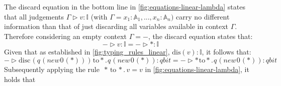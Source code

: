 The discard equation in  the bottom line  in \autoref{fig:equations-linear-lambda} states that all judgements $\Gamma \triangleright v : \mathbb{I}$ (with $\Gamma = x_{1} : \mathbb{A}_1, . . . , x_{n} : \mathbb{A}_n)$ carry no different information than that of just discarding all variables available in context $\Gamma$. Therefore considering an empty context $\Gamma = - $, the discard equation states that:
\begin{equation}
  - \triangleright v: \mathbb{I} = - \triangleright *: \mathbb{I}
\end{equation}
Given that as established in \autoref{fig:typing_rules_linear}, $ \text{dis}(v):  \mathbb{I}$, it follows that:
\begin{equation}
 - \triangleright \text{disc} \hspace{1pt} (q \hspace{1pt} (\textit{new}\hspace{1pt}0 \hspace{1pt}(*))) \hspace{1pt} \text{to} *. \hspace{1pt} q \hspace{1pt} (\textit{new}\hspace{1pt}0 \hspace{1pt}(*)): \textit{qbit} = - \triangleright * \hspace{1pt} \text{to} *. \hspace{1pt} q \hspace{1pt} (\textit{new}\hspace{1pt}0 \hspace{1pt}(*)): \textit{qbit}
\end{equation}
Subsequently applying the rule  $ \hspace{2pt} * \hspace{2pt} \text{to} \hspace{2pt}* . \hspace{2pt}v = v$ in \autoref{fig:equations-linear-lambda}, it holds that
